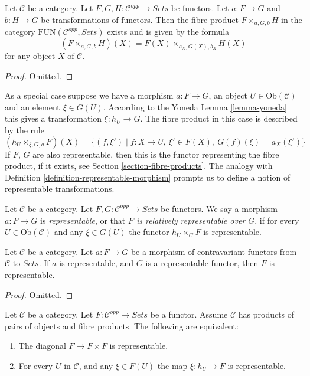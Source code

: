 \begin{lemma}
\label{lemma-fibre-product-presheaves}
Let $\mathcal{C}$ be a category.
Let $F, G, H : \mathcal{C}^{opp} \to \textit{Sets}$
be functors. Let $a : F \to G$ and $b : H \to G$ be
transformations of functors. Then the fibre product
$F \times_{a, G, b} H$ in the category
$\text{FUN}(\mathcal{C}^{opp}, \textit{Sets})$
exists and is given by the formula
$$
(F \times_{a, G, b} H)(X) =
F(X) \times_{a_X, G(X), b_X} H(X)
$$
for any object $X$ of $\mathcal{C}$.
\end{lemma}

\begin{proof}
Omitted.
\end{proof}

\noindent
As a special case suppose we have a morphism
$a : F \to G$, an object $U \in \text{Ob}(\mathcal{C})$
and an element $\xi \in G(U)$. According to the Yoneda
Lemma \ref{lemma-yoneda} this gives a transformation
$\xi : h_U \to G$. The fibre product in this case
is described by the rule
$$
(h_U \times_{\xi, G, a} F)(X) =
\{ (f, \xi') \mid f : X \to U, \ \xi' \in F(X), \ G(f)(\xi) = a_X(\xi')\}
$$
If $F$, $G$ are also representable, then this is the functor representing the
fibre product, if it exists, see Section \ref{section-fibre-products}.
The analogy with Definition \ref{definition-representable-morphism}
prompts us to define a notion
of representable transformations.

\begin{definition}
\label{definition-representable-map-presheaves}
Let $\mathcal{C}$ be a category.
Let $F, G : \mathcal{C}^{opp} \to \textit{Sets}$
be functors. We say a morphism $a : F \to G$ is
{\it representable}, or that {\it $F$ is relatively representable
over $G$}, if for every $U \in \text{Ob}(\mathcal{C})$
and any $\xi \in G(U)$ the functor
$h_U \times_G F$ is representable.
\end{definition}

\begin{lemma}
\label{lemma-representable-over-representable}
Let $\mathcal{C}$ be a category.
Let $a : F \to G$ be a morphism of contravariant functors
from $\mathcal{C}$ to $\textit{Sets}$. If $a$ is representable,
and $G$ is a representable functor, then $F$ is representable.
\end{lemma}

\begin{proof}
Omitted.
\end{proof}

\begin{lemma}
\label{lemma-representable-diagonal}
Let $\mathcal{C}$ be a category.
Let $F : \mathcal{C}^{opp} \to \textit{Sets}$ be a functor.
Assume $\mathcal{C}$ has products of pairs of objects and fibre products.
The following are equivalent:
\begin{enumerate}
\item The diagonal $F \to F \times F$ is representable.
\item For every $U$ in $\mathcal{C}$,
and any $\xi \in F(U)$ the map $\xi : h_U \to F$ is representable.
\end{enumerate}
\end{lemma}

